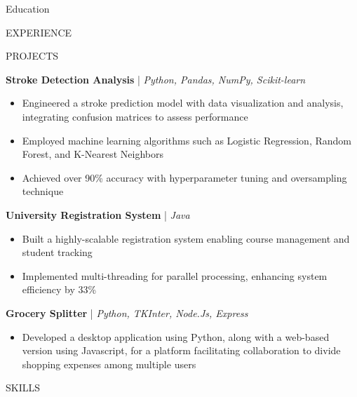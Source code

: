 \documentclass{resume} %
\begin{document}
\begin{rSection}{Education}
\begin{rSection}{EXPERIENCE}
\end{rSection} 
\begin{rSection}{PROJECTS}
\vspace{-1.25em}
\item \textbf{Stroke Detection Analysis} | \textit{Python, Pandas, NumPy, Scikit-learn}
\begin{itemize}
\itemsep -3pt {}
\item Engineered a stroke prediction model with data visualization and analysis, integrating confusion matrices to assess performance
\item Employed machine learning algorithms such as Logistic Regression, Random Forest, and K-Nearest Neighbors
\item Achieved over 90\% accuracy with hyperparameter tuning and oversampling technique
\end{itemize}

\item \textbf{University Registration System} | \textit{Java}
\begin{itemize}
\itemsep -3pt {}
\item Built a highly-scalable registration system enabling course management and student tracking
\item Implemented multi-threading for parallel processing, enhancing system efficiency by 33\%
\end{itemize}

\item \textbf{Grocery Splitter} | \textit{Python, TKInter, Node.Js, Express}
\begin{itemize}
\itemsep -3pt {}
\item Developed a desktop application using Python, along with a web-based version using Javascript, for a platform facilitating collaboration  to divide shopping expenses among multiple users
\end{itemize}
\end{rSection}
\begin{rSection}{SKILLS}


\end{rSection}
\end{rSection}
\end{document}
